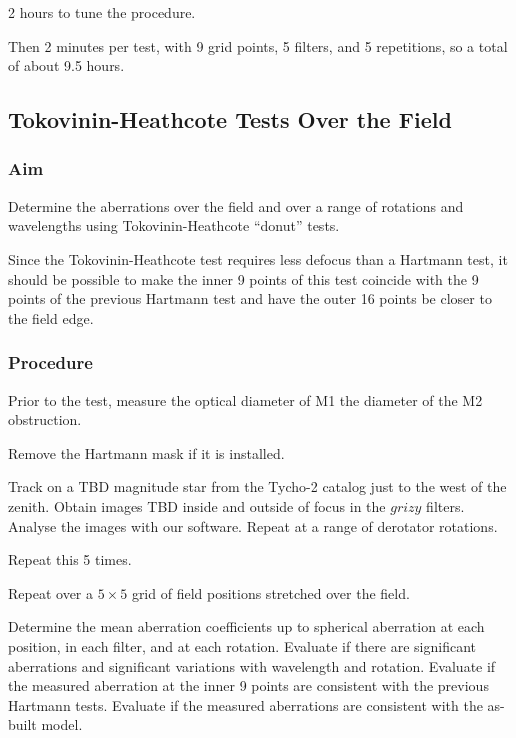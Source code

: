 \documentclass{article}
\begin{document}
2 hours to tune the procedure.

Then 2 minutes per test, with 9 grid points, 5 filters, and 5 repetitions, so a total of about 9.5 hours.


\subsection{Tokovinin-Heathcote Tests Over the Field}

\subsubsection{Aim}

Determine the aberrations over the field and over a range of rotations and wavelengths using Tokovinin-Heathcote “donut” tests.

Since the Tokovinin-Heathcote test requires less defocus than a Hartmann test, it should be possible to make the inner 9 points of this test coincide with the 9 points of the previous Hartmann test and have the outer 16 points be closer to the field edge.

\subsubsection{Procedure}

Prior to the test, measure the optical diameter of M1 the diameter of the M2 obstruction.

Remove the Hartmann mask if it is installed.

Track on a TBD magnitude star from the Tycho-2 catalog just to the west of the zenith. Obtain images TBD inside and outside of focus in the $grizy$ filters. Analyse the images with our software. Repeat at a range of derotator rotations.

Repeat this 5 times.

Repeat over a $5\times5$ grid of field positions stretched over the field.

Determine the mean aberration coefficients up to spherical aberration at each position, in each filter, and at each rotation. Evaluate if there are significant aberrations and significant variations with wavelength and rotation. Evaluate if the measured aberration at the inner 9 points are consistent with the previous Hartmann tests. Evaluate if the measured aberrations are consistent with the as-built model.
\end{document}
